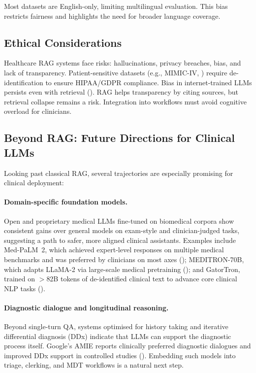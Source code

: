 Most datasets are English-only, limiting multilingual evaluation. This bias restricts fairness and highlights the need for broader language coverage.

\subsection{Ethical Considerations}

Healthcare RAG systems face risks: hallucinations, privacy breaches, bias, and lack of transparency. Patient-sensitive datasets (e.g., MIMIC-IV, \citep{johnson2023mimiciv}) require de-identification to ensure HIPAA/GDPR compliance. Bias in internet-trained LLMs persists even with retrieval (\citep{mehrabi2021survey}). RAG helps transparency by citing sources, but retrieval collapse remains a risk. Integration into workflows must avoid cognitive overload for clinicians.

\subsection{Beyond RAG: Future Directions for Clinical LLMs}

Looking past classical RAG, several trajectories are especially promising for clinical deployment:

\paragraph{Domain-specific foundation models.}
Open and proprietary medical LLMs fine-tuned on biomedical corpora show consistent gains over general models on exam-style and clinician-judged tasks, suggesting a path to safer, more aligned clinical assistants. Examples include Med-PaLM~2, which achieved expert-level responses on multiple medical benchmarks and was preferred by clinicians on most axes (\citep{singhal2024medpalm2}); MEDITRON-70B, which adapts LLaMA-2 via large-scale medical pretraining (\citep{chen2023meditron}); and GatorTron, trained on $>$82B tokens of de-identified clinical text to advance core clinical NLP tasks (\citep{yang2022gatortron}).

\paragraph{Diagnostic dialogue and longitudinal reasoning.}
Beyond single-turn QA, systems optimised for history taking and iterative differential diagnosis (DDx) indicate that LLMs can support the diagnostic process itself. Google's AMIE reports clinically preferred diagnostic dialogues and improved DDx support in controlled studies (\citep{amie2025nature,amie2024blog}). Embedding such models into triage, clerking, and MDT workflows is a natural next step.

